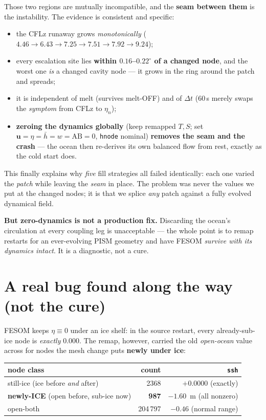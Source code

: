 \documentclass[11pt,a4paper]{article}
\newcommand{\code}[1]{\texttt{\small #1}}
\begin{document}
\noindent
Those two regions are mutually incompatible, and the \textbf{seam between them} is the
instability. The evidence is consistent and specific:

\begin{itemize}
\item the CFLz runaway grows \emph{monotonically} ($4.46 \to 6.43 \to 7.25 \to 7.51 \to 7.92
      \to 9.24$);
\item every escalation site lies \textbf{within $0.16$--$0.22^\circ$ of a changed node}, and
      the worst one \emph{is} a changed cavity node --- it grows in the ring around the patch
      and spreads;
\item it is independent of melt (survives melt-OFF) and of $\Delta t$ (60\,s merely swaps the
      \emph{symptom} from CFLz to $\eta_n$);
\item \textbf{zeroing the dynamics globally} (keep remapped $T,S$; set
      $\mathbf{u}=\eta=\bar{h}=w=\mathrm{AB}=0$, \code{hnode} nominal) \textbf{removes the
      seam and the crash} --- the ocean then re-derives its own balanced flow from rest, exactly
      as the cold start does.
\end{itemize}

\noindent
This finally explains why \emph{five} fill strategies all failed identically: each one varied
the \emph{patch} while leaving the \emph{seam} in place. The problem was never the values we
put at the changed nodes; it is that we splice \emph{any} patch against a fully evolved
dynamical field.

\medskip\noindent
\textbf{But zero-dynamics is not a production fix.} Discarding the ocean's circulation at every
coupling leg is unacceptable --- the whole point is to remap restarts for an ever-evolving PISM
geometry and have FESOM \emph{survive with its dynamics intact}. It is a diagnostic, not a cure.

\section{A real bug found along the way (not the cure)}\label{sec:ssh}

FESOM keeps $\eta \equiv 0$ under an ice shelf: in the source restart, every already-sub-ice
node is \emph{exactly} $0.000$. The remap, however, carried the old \emph{open-ocean} value
across for nodes the mesh change puts \textbf{newly under ice}:

\begin{center}
\begin{tabular}{@{}lrr@{}}
\toprule
node class & count & \code{ssh} \\
\midrule
still-ice (ice before \emph{and} after) & 2368 & $+0.0000$ (exactly) \\
\textbf{newly-ICE} (open before, sub-ice now) & \textbf{987} & $\mathbf{-1.60}$~m (all nonzero) \\
open-both & 204\,797 & $-0.46$ (normal range) \\
\bottomrule
\end{tabular}
\end{center}
\end{document}
